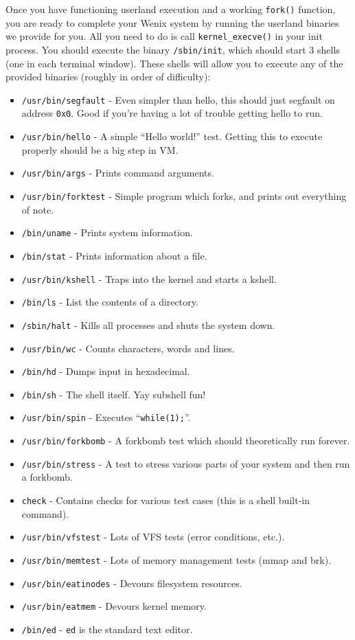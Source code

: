Once you have functioning userland execution and a working \texttt{fork()} function, you are ready to complete your Wenix system by running the userland binaries we provide for you. All you need to do is call \texttt{kernel\_execve()} in your init process. You should execute the binary \texttt{/sbin/init}, which should start 3 shells (one in each terminal window). These shells will allow you to execute any of the provided binaries (roughly in order of difficulty):
\begin{itemize}
    \item \texttt{/usr/bin/segfault} - Even simpler than hello, this should just segfault on address \texttt{0x0}. Good if you're having a lot of trouble getting hello to run.
    \item \texttt{/usr/bin/hello} - A simple ``Hello world!'' test. Getting this to execute properly should be a big step in VM.
    \item \texttt{/usr/bin/args} - Prints command arguments.
    \item \texttt{/usr/bin/forktest} - Simple program which forks, and prints out everything of note.
    \item \texttt{/bin/uname} - Prints system information.
    \item \texttt{/bin/stat} - Prints information about a file.
    \item \texttt{/usr/bin/kshell} - Traps into the kernel and starts a kshell.
    \item \texttt{/bin/ls} - List the contents of a directory.
    \item \texttt{/sbin/halt} - Kills all processes and shuts the system down.
    \item \texttt{/usr/bin/wc} - Counts characters, words and lines.
    \item \texttt{/bin/hd} - Dumps input in hexadecimal.
    \item \texttt{/bin/sh} - The shell itself. Yay subshell fun!
    \item \texttt{/usr/bin/spin} - Executes ``\texttt{while(1);}''.
    \item \texttt{/usr/bin/forkbomb} - A forkbomb test which should theoretically run forever.
    \item \texttt{/usr/bin/stress} - A test to stress various parts of your system and then run a forkbomb.
    \item \texttt{check} - Contains checks for various test cases (this is a shell built-in command).
    \item \texttt{/usr/bin/vfstest} - Lots of VFS tests (error conditions, etc.).
    \item \texttt{/usr/bin/memtest} - Lots of memory management tests (mmap and brk).
    \item \texttt{/usr/bin/eatinodes} - Devours filesystem resources.
    \item \texttt{/usr/bin/eatmem} - Devours kernel memory.
    \item \texttt{/bin/ed} - \texttt{ed} is the standard text editor.
\end{itemize}

